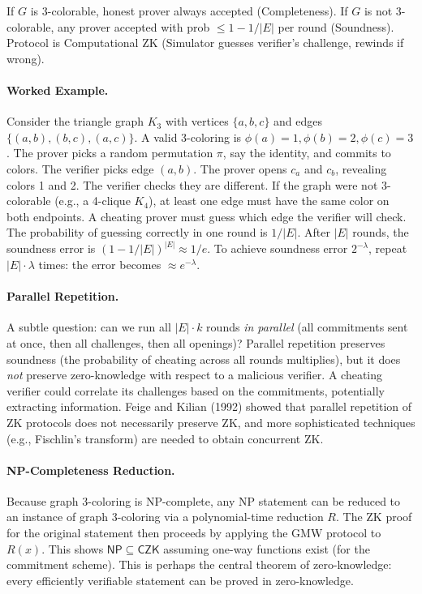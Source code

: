 \begin{theorem}
If $G$ is 3-colorable, honest prover always accepted (Completeness).
If $G$ is not 3-colorable, any prover accepted with prob $\le 1 - 1/|E|$ per round (Soundness).
Protocol is Computational ZK (Simulator guesses verifier's challenge, rewinds if wrong).
\end{theorem}

\paragraph{Worked Example.} Consider the triangle graph $K_3$ with vertices $\{a,b,c\}$ and edges $\{(a,b),(b,c),(a,c)\}$. A valid 3-coloring is $\phi(a)=1, \phi(b)=2, \phi(c)=3$. The prover picks a random permutation $\pi$, say the identity, and commits to colors. The verifier picks edge $(a,b)$. The prover opens $c_a$ and $c_b$, revealing colors 1 and 2. The verifier checks they are different. If the graph were not 3-colorable (e.g., a 4-clique $K_4$), at least one edge must have the same color on both endpoints. A cheating prover must guess which edge the verifier will check. The probability of guessing correctly in one round is $1/|E|$. After $|E|$ rounds, the soundness error is $(1 - 1/|E|)^{|E|} \approx 1/e$. To achieve soundness error $2^{-\lambda}$, repeat $|E| \cdot \lambda$ times: the error becomes $\approx e^{-\lambda}$.

\paragraph{Parallel Repetition.} A subtle question: can we run all $|E| \cdot k$ rounds \emph{in parallel} (all commitments sent at once, then all challenges, then all openings)? Parallel repetition preserves soundness (the probability of cheating across all rounds multiplies), but it does \emph{not} preserve zero-knowledge with respect to a malicious verifier. A cheating verifier could correlate its challenges based on the commitments, potentially extracting information. Feige and Kilian (1992) showed that parallel repetition of ZK protocols does not necessarily preserve ZK, and more sophisticated techniques (e.g., Fischlin's transform) are needed to obtain concurrent ZK.

\paragraph{NP-Completeness Reduction.} Because graph 3-coloring is NP-complete, any NP statement can be reduced to an instance of graph 3-coloring via a polynomial-time reduction $R$. The ZK proof for the original statement then proceeds by applying the GMW protocol to $R(x)$. This shows $\mathsf{NP} \subseteq \mathsf{CZK}$ assuming one-way functions exist (for the commitment scheme). This is perhaps the central theorem of zero-knowledge: every efficiently verifiable statement can be proved in zero-knowledge.

